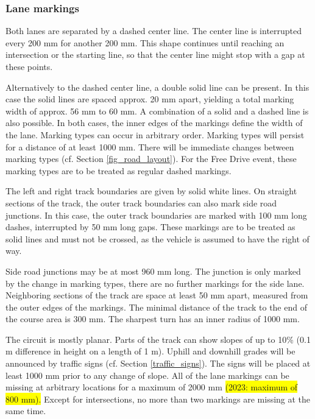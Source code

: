 \documentclass[a4paper]{report}
\begin{document}
\subsubsection{Lane markings}
\label{lane_markings}

Both lanes are separated by a dashed center line. The center line is interrupted every 200 mm for another 200 mm. This shape continues until reaching an intersection or the starting line, so that the center line might stop with a gap at these points. 

Alternatively to the dashed center line, a double solid line can be present. In this case the solid lines are spaced approx. 20 mm apart, yielding a total marking width of approx. 56 mm to 60 mm. A combination of a solid and a dashed line is also possible. In both cases, the inner edges of the markings define the width of the lane. Marking types can occur in arbitrary order. Marking types will persist for a distance of at least 1000 mm. There will be immediate changes between marking types (cf. Section \ref{fig_road_layout}). For the Free Drive event, these marking types are to be treated as regular dashed markings. 

The left and right track boundaries are given by solid white lines. On straight sections of the track, the outer track boundaries can also mark side road junctions. In this case, the outer track boundaries are marked with 100 mm long dashes, interrupted by 50 mm long gaps. These markings are to be treated as solid lines and must not be crossed, as the vehicle is assumed to have the right of way. 

Side road junctions may be at most 960 mm long. The junction is only marked by the change in marking types, there are no further markings for the side lane. Neighboring sections of the track are space at least 50 mm apart, measured from the outer edges of the markings. The minimal distance of the track to the end of the course area is 300 mm. The sharpest turn has an inner radius of 1000 mm. 

The circuit is mostly planar. Parts of the track can show slopes of up to 10\% (0.1 m difference in height on a length of 1 m). Uphill and downhill grades will be announced by traffic signs (cf. Section \ref{traffic_signs}). The signs will be placed at least 1000 mm prior to any change of slope. All of the lane markings can be missing at arbitrary locations for a maximum of 2000 mm \colorbox{yellow}{(2023: maximum of 800 mm).} Except for intersections, no more than two markings are missing at the same time. 
\end{document}
